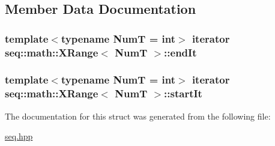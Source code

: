 \subsection{Member Data Documentation}
\hypertarget{structseq_1_1math_1_1_x_range_ad0c15c89614e21576d3f6175d9ca1009}{
\subsubsection[{end\-It}]{\setlength{\rightskip}{0pt plus 5cm}template$<$typename Num\-T = int$>$ {\bf iterator} {\bf seq\-::math\-::\-X\-Range}$<$ Num\-T $>$\-::{\bf end\-It}}}\label{structseq_1_1math_1_1_x_range_ad0c15c89614e21576d3f6175d9ca1009}
\hypertarget{structseq_1_1math_1_1_x_range_ab79c83388a6443fe62ad2a4162af999d}{
\subsubsection[{start\-It}]{\setlength{\rightskip}{0pt plus 5cm}template$<$typename Num\-T = int$>$ {\bf iterator} {\bf seq\-::math\-::\-X\-Range}$<$ Num\-T $>$\-::{\bf start\-It}}}\label{structseq_1_1math_1_1_x_range_ab79c83388a6443fe62ad2a4162af999d}


The documentation for this struct was generated from the following file\-:\begin{DoxyCompactItemize}
\item 
\hyperlink{seq_8hpp}{seq.\-hpp}\end{DoxyCompactItemize}
